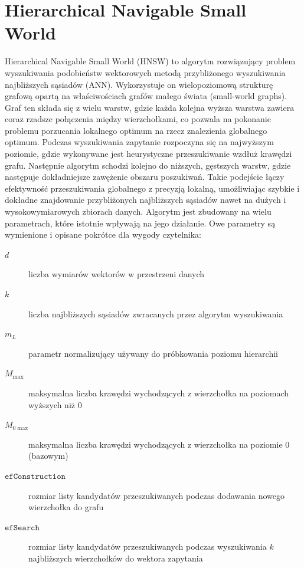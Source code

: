 \documentclass[twocolumn]{article}
\begin{document}
\section{Hierarchical Navigable Small World}
Hierarchical Navigable Small World (HNSW) to algorytm rozwiązujący problem wyszukiwania podobieństw wektorowych metodą przybliżonego wyszukiwania najbliższych sąsiadów (ANN). Wykorzystuje on wielopoziomową strukturę grafową opartą na właściwościach grafów małego świata (small-world graphs). Graf ten składa się z wielu warstw, gdzie każda kolejna wyższa warstwa zawiera coraz rzadsze połączenia między wierzchołkami, co pozwala na pokonanie problemu porzucania lokalnego optimum na rzecz znalezienia globalnego optimum.
\newline
Podczas wyszukiwania zapytanie rozpoczyna się na najwyższym poziomie, gdzie wykonywane jest heurystyczne przeszukiwanie wzdłuż krawędzi grafu. Następnie algorytm schodzi kolejno do niższych, gęstszych warstw, gdzie następuje dokładniejsze zawężenie obszaru poszukiwań. Takie podejście łączy efektywność przeszukiwania globalnego z precyzją lokalną, umożliwiając szybkie i dokładne znajdowanie przybliżonych najbliższych sąsiadów nawet na dużych i wysokowymiarowych zbiorach danych.
\newline\newline
Algorytm jest zbudowany na wielu parametrach, które istotnie wpływają na jego działanie. Owe parametry są wymienione i opisane pokrótce dla wygody czytelnika:
\begin{description}
  \item[$d$] liczba wymiarów wektorów w przestrzeni danych
  \item[$k$] liczba najbliższych sąsiadów zwracanych przez algorytm wyszukiwania
  \item[$m_L$] parametr normalizujący używany do próbkowania poziomu hierarchii
  \item[$M_{\max}$] maksymalna liczba krawędzi wychodzących z wierzchołka na poziomach wyższych niż 0
  \item[$M_{0\max}$] maksymalna liczba krawędzi wychodzących z wierzchołka na poziomie 0 (bazowym)
  \item[$\texttt{efConstruction}$] rozmiar listy kandydatów przeszukiwanych podczas dodawania nowego wierzchołka do grafu
\item[$\texttt{efSearch}$] rozmiar listy kandydatów przeszukiwanych podczas wyszukiwania $k$ najbliższych wierzchołków do wektora zapytania
\end{description}
\newpage
\end{document}
